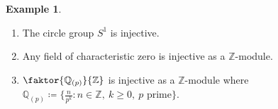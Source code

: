 \documentclass[10pt,letterpaper,cm]{nupset}
\theoremstyle{definition}
\newtheorem{exmp}[definition]{Example}
\theoremstyle{theorem}
\newtheorem{corollary}[definition]{Corollary}
\theoremstyle{remark}
\newcommand{\Q}{\mathbb Q}
\newcommand{\Z}{\mathbb Z}
\newcommand{\1}{\mathbf{1}}
\newcommand{\0}{\vec 0}
\begin{document}
\begin{exmp}
\begin{enumerate}
\begin{proof}
We claim that $\tilde{\xi}$ is well-defined. If $\{n \in \Z : nx \in A\} = (0)$, then $\tilde{\xi}(x) =0$ and $\tilde{\xi}(\tilde{a}) = \xi(a)$, where $a$ is uniquely determined from $\tilde{a}$.  If $\{n \in \Z : nx \in A\} = (n_0)$, then $\tilde{\xi}(\tilde{a}) = \xi(a) + \frac{m\xi(n_0x)}{n_0}$. If $\tilde{a} = b + kx$, then $a-b = (k-m)x $. If this equals $0$, then we're done.
Otherwise, $k-m = dn_0$ for some integer $d\ne 0$.  Then 
\begin{align*} 
& 0 = \xi(a-b) - \xi((k-m)x) = \xi(a) - \xi(b) - \xi(dn_0x) 
\\ & =  \xi(a) - \xi(b) - \tilde{\xi}(dn_0x) =  \xi(a) - \xi(b) -dn_0 \tilde{\xi}(x)
\\ & =  \xi(a) - \xi(b) -(k-m) \tilde{\xi}(x) = \xi(a) - \xi(b) +\frac{m-k}{n_0}\xi(n_0x)
\\ & = \tilde{\xi}(a+mx) - \tilde{\xi}(b+kx).
\end{align*}
We have shown that $(\tilde{A}, \tilde{\xi}) > (A, \xi)$, a contradiction. 
\end{proof}
\begin{corollary}
Any divisible abelian group is injective.
\end{corollary}
\item The circle group $S^1$ is injective.
\item Any field of characteristic zero is injective as a $\Z$-module. 
\item $\faktor{\Q_{(p)}}{\Z}$ is injective as a $\Z$-module where $\Q_{(p)} \coloneqq  \{\frac{n}{p^k} : n \in \Z, \ k\geq 0,  \ p \text{ prime}  \}$.
\end{enumerate}
\end{exmp}
\end{document}
